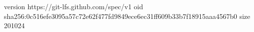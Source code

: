 version https://git-lfs.github.com/spec/v1
oid sha256:0c516efe3095a57c72e62f477fd9849ece6ec31ff609b33b7f18915aaa4567b0
size 201024
